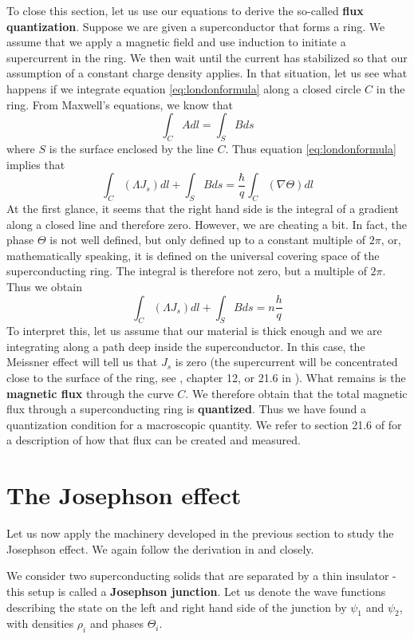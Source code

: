 \documentclass[a4paper, draft]{article}
\theoremstyle{own}
\theoremstyle{remark}
\begin{document}
To close this section, let us use our equations to derive the so-called {\bf flux quantization}. Suppose we are given a superconductor that forms a ring. We assume that we apply a magnetic field and use induction to initiate a supercurrent in the ring. We then wait until the current has stabilized so that our assumption of a constant charge density applies. In that situation, let us see what happens if we integrate equation \eqref{eq:londonformula} along a closed circle $C$ in the ring. From Maxwell's equations, we know that
$$
\int_C A dl = \int_S B ds
$$
where $S$ is the surface enclosed by the line $C$. Thus equation \eqref{eq:londonformula} implies that
$$
\int_C (\Lambda J_s) dl + \int_S B ds = \frac{\hbar}{q} \int_C (\nabla \Theta) dl
$$
At the first glance, it seems that the right hand side is the integral of a gradient along a closed line and therefore zero. However, we are cheating a bit. In fact, the phase $\Theta$ is not well defined, but only defined up to a constant multiple of $2 \pi$, or, mathematically speaking, it is defined on the universal covering space of the superconducting ring. The integral is therefore not zero, but a multiple of $2\pi$. Thus we obtain
$$
\int_C (\Lambda J_s) dl + \int_S B ds = n \frac{h}{q}   
$$
To interpret this, let us assume that our material is thick enough and we are integrating along a path deep inside the superconductor. In this case, the Meissner effect will tell us that $J_s$ is zero (the supercurrent will be concentrated close to the surface of the ring, see \cite{Kittel}, chapter 12, or 21.6 in \cite{FeynmanIII}). What remains is the {\bf magnetic flux} through the curve $C$. We therefore obtain that the total magnetic flux through a superconducting ring is {\bf quantized}. Thus we have found a quantization condition for a macroscopic quantity. We refer to section 21.6 of \cite{FeynmanIII} for a description of how that flux can be created and measured.


\section{The Josephson effect}

Let us now apply the machinery developed in the previous section to study the Josephson effect. We again follow the derivation in \cite{Kittel} and \cite{FeynmanIII} closely. 

We consider two superconducting solids that are separated by a thin insulator - this setup is called a {\bf Josephson junction}. Let us denote the wave functions describing the state on the left and right hand side of the junction by $\psi_1$ and $\psi_2$, with densities $\rho_i$ and phases $\Theta_i$. 
\end{document}
